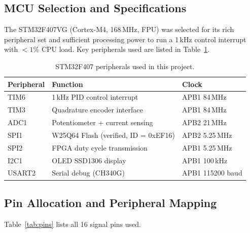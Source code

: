 \documentclass[12pt, a4paper]{report}
\begin{document}
\subsection{MCU Selection and Specifications}

The STM32F407VG (Cortex-M4, 168\,MHz, FPU) was selected for its rich
peripheral set and sufficient processing power to run a 1\,kHz control
interrupt with $<1\%$ CPU load. Key peripherals used are listed in
Table~\ref{tab:mcu_periph}.

\begin{table}[H]
    \centering
    \caption{STM32F407 peripherals used in this project.}
    \label{tab:mcu_periph}
    \begin{tabular}{lll}
        \toprule
        \textbf{Peripheral} & \textbf{Function} & \textbf{Clock} \\
        \midrule
        TIM6     & 1\,kHz PID control interrupt & APB1 84\,MHz \\
        TIM3     & Quadrature encoder interface & APB1 84\,MHz \\
        ADC1     & Potentiometer + current sensing & APB2 21\,MHz \\
        SPI1     & W25Q64 Flash (verified, ID = 0xEF16) & APB2 5.25\,MHz \\
        SPI2     & FPGA duty cycle transmission & APB1 5.25\,MHz \\
        I2C1     & OLED SSD1306 display & APB1 100\,kHz \\
        USART2   & Serial debug (CH340G) & APB1 115200 baud \\
        \bottomrule
    \end{tabular}
\end{table}

\subsection{Pin Allocation and Peripheral Mapping}

Table~\ref{tab:pins} lists all 16 signal pins used.
\end{document}

